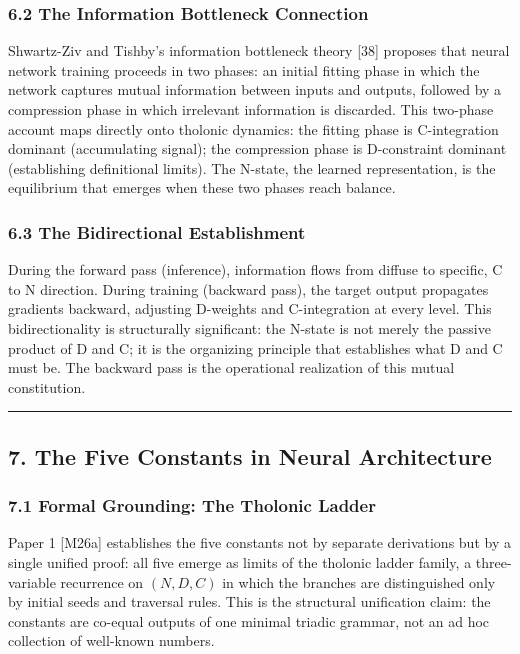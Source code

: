 \documentclass[
  11pt,
  letterpaper,
]{article}
\begin{document}
\subsubsection{6.2 The Information Bottleneck
Connection}\label{the-information-bottleneck-connection}

Shwartz-Ziv and Tishby's information bottleneck theory {[}38{]} proposes
that neural network training proceeds in two phases: an initial fitting
phase in which the network captures mutual information between inputs
and outputs, followed by a compression phase in which irrelevant
information is discarded. This two-phase account maps directly onto
tholonic dynamics: the fitting phase is C-integration dominant
(accumulating signal); the compression phase is D-constraint dominant
(establishing definitional limits). The N-state, the learned
representation, is the equilibrium that emerges when these two phases
reach balance.

\subsubsection{6.3 The Bidirectional
Establishment}\label{the-bidirectional-establishment}

During the forward pass (inference), information flows from diffuse to
specific, C to N direction. During training (backward pass), the target
output propagates gradients backward, adjusting D-weights and
C-integration at every level. This bidirectionality is structurally
significant: the N-state is not merely the passive product of D and C;
it is the organizing principle that establishes what D and C must be.
The backward pass is the operational realization of this mutual
constitution.

\begin{center}\rule{0.5\linewidth}{0.5pt}\end{center}

\subsection{7. The Five Constants in Neural
Architecture}\label{the-five-constants-in-neural-architecture}

\subsubsection{7.1 Formal Grounding: The Tholonic
Ladder}\label{formal-grounding-the-tholonic-ladder}

Paper 1 {[}M26a{]} establishes the five constants not by separate
derivations but by a single unified proof: all five emerge as limits of
the tholonic ladder family, a three-variable recurrence on \((N, D, C)\)
in which the branches are distinguished only by initial seeds and
traversal rules. This is the structural unification claim: the constants
are co-equal outputs of one minimal triadic grammar, not an ad hoc
collection of well-known numbers.
\end{document}

